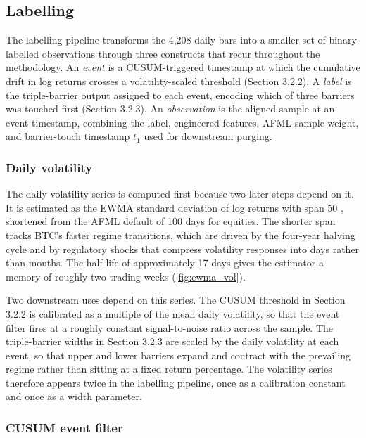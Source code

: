 \documentclass[12pt,a4paper,oneside]{article}
\begin{document}
\subsection{Labelling}\label{subsec:labeling}

The labelling pipeline transforms the 4,208 daily bars into a smaller set of binary-labelled observations through three constructs that recur throughout the methodology. An \textit{event} is a CUSUM-triggered timestamp at which the cumulative drift in log returns crosses a volatility-scaled threshold (Section 3.2.2). A \textit{label} is the triple-barrier output assigned to each event, encoding which of three barriers was touched first (Section 3.2.3). An \textit{observation} is the aligned sample at an event timestamp, combining the label, engineered features, AFML sample weight, and barrier-touch timestamp $t_1$ used for downstream purging.


\subsubsection{Daily volatility}\label{subsubsec:vol}

The daily volatility series is computed first because two later steps depend on it. It is estimated as the EWMA standard deviation of log returns with span 50 \citep[Snippet 3.1]{lopez_de_prado_2018}, shortened from the AFML default of 100 days for equities. The shorter span tracks BTC's faster regime transitions, which are driven by the four-year halving cycle and by regulatory shocks that compress volatility responses into days rather than months. The half-life of approximately 17 days gives the estimator a memory of roughly two trading weeks \label{ref:ewma_call}(\autoref{fig:ewma_vol}).

Two downstream uses depend on this series. The CUSUM threshold in Section 3.2.2 is calibrated as a multiple of the mean daily volatility, so that the event filter fires at a roughly constant signal-to-noise ratio across the sample. The triple-barrier widths in Section 3.2.3 are scaled by the daily volatility at each event, so that upper and lower barriers expand and contract with the prevailing regime rather than sitting at a fixed return percentage. The volatility series therefore appears twice in the labelling pipeline, once as a calibration constant and once as a width parameter.


\subsubsection{CUSUM event filter}\label{subsubsec:cusum}
\end{document}

